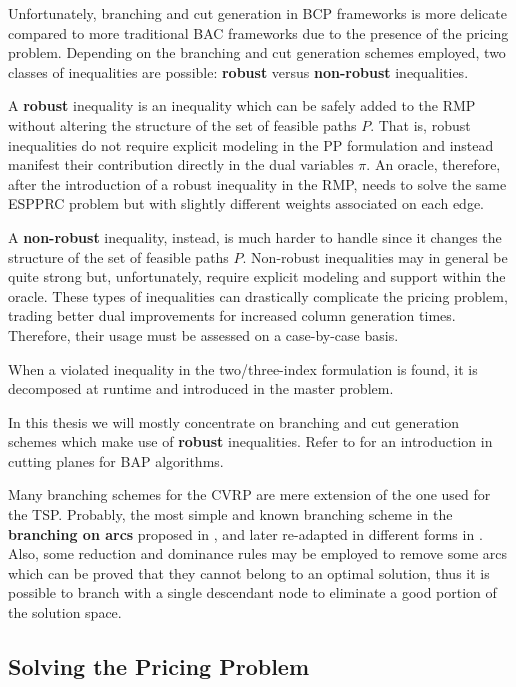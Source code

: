 \medskip

Unfortunately, branching and cut generation in BCP frameworks is more delicate compared to more traditional BAC frameworks due to the presence of the pricing problem.
Depending on the branching and cut generation schemes employed, two classes of inequalities are possible: \textbf{robust} versus \textbf{non-robust} inequalities.

A \textbf{robust} inequality is an inequality which can be safely added to the RMP without altering the structure of the set of feasible paths $P$.
That is, robust inequalities do not require explicit modeling in the PP formulation and instead manifest their contribution directly in the dual variables $\pi$.
An oracle, therefore, after the introduction of a robust inequality in the RMP, needs to solve the same ESPPRC problem but with slightly different weights associated on each edge.

A \textbf{non-robust} inequality, instead, is much harder to handle since it changes the structure of the set of feasible paths $P$.
Non-robust inequalities may in general be quite strong but, unfortunately, require explicit modeling and support within the oracle.
These types of inequalities can drastically complicate the pricing problem, trading better dual improvements for increased column generation times.
Therefore, their usage must be assessed on a case-by-case basis.

When a violated inequality in the two/three-index formulation is found, it is decomposed at runtime and introduced in the master problem.

In this thesis we will mostly concentrate on branching and cut generation schemes which make use of \textbf{robust} inequalities.
Refer to \textcite{desaulniers2011} for an introduction in cutting planes for BAP algorithms.

Many branching schemes for the CVRP are mere extension of the one used for the TSP.
Probably, the most simple and known branching scheme in the \textbf{branching on arcs} proposed in \textcite{christofides1969a},
and later re-adapted in different forms in \textcite{fisher1994a, miller1995}.
Also, some reduction and dominance rules may be employed to remove some arcs
which can be proved that they cannot belong to an optimal solution,
thus it is possible to branch with a single descendant node to eliminate
a good portion of the solution space.

\subsection{Solving the Pricing Problem}
\label{sec:intro-solving-the-pricing-problem}

